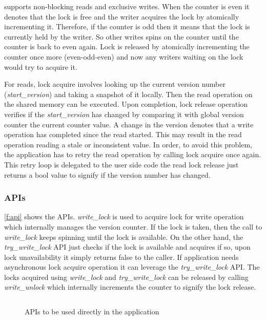 \sys supports non-blocking reads and exclusive writes. When the counter is even
it denotes that the lock is free and the writer acquires the lock by atomically
incrementing it. Therefore, if the counter is odd then it means that the lock is
currently held by the writer. So other writes spins on the counter until the
counter is back to even again. Lock is released by atomically incrementing the
counter once more (even-odd-even) and now any writers waiting on the lock would
try to acquire it. 

For reads, lock acquire involves looking up the current version number
(\emph{start\_version}) and taking a snapshot of it locally. Then the read
operation on the shared memory can be executed. Upon completion, lock release
operation verifies if the \emph{start\_version} has changed by comparing it with
global version counter \ie the current counter value.  A change in the version
denotes that a write operation has completed since the read started. This may
result in the read operation reading a stale or inconsistent value. In order,
to avoid this problem, the application has to retry the read operation by
calling lock acquire once again. This retry loop is delegated to the user side
code \ie the \sys read lock release just returns a bool value to signify if the
version number has changed. 

\subsubsection{\sys APIs}
\label{s:des:vl:APIs}



\autoref{f:api} shows the \sys APIs. \emph{write\_lock} is used to acquire lock
for write operation which internally manages the version counter. If the lock is
taken, then the call to \emph{write\_lock} keeps spinning until the lock is
available. On the other hand, the \emph{try\_write\_lock} API just checks if the
lock is available and acquires if so, upon lock unavailability it simply returns
false to the caller. If application needs asynchronous lock acquire operation it
can leverage the \emph{try\_write\_lock} API. The locks acquired using
\emph{write\_lock} and \emph{try\_write\_lock} can be released by calling
\emph{write\_unlock} which internally increments the counter to signify the lock
release. 

\begin{figure}[t]
 \centering
 \begin{subfloat}
 \centering
 \inputminted[xleftmargin=11pt,fontsize=\scriptsize,escapeinside=@@]{c}{code/api.c}
 \end{subfloat}
 \coderule
	\caption{\sys APIs to be used directly in the application}
 \label{f:api}
\end{figure}

